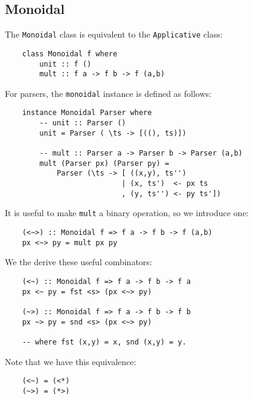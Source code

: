 \documentclass[a4paper,12pt]{article}
\theoremstyle{remark}
\begin{document}
\subsection{Monoidal}

The \lstinline{Monoidal} class is equivalent to the \lstinline{Applicative} class:

\begin{lstlisting}
    class Monoidal f where
        unit :: f ()
        mult :: f a -> f b -> f (a,b)  \end{lstlisting}

For parsers, the \lstinline{monoidal} instance is defined as follows:

\begin{lstlisting}
    instance Monoidal Parser where
        -- unit :: Parser ()
        unit = Parser ( \ts -> [((), ts)])

        -- mult :: Parser a -> Parser b -> Parser (a,b)
        mult (Parser px) (Parser py) =
            Parser (\ts -> [ ((x,y), ts'')
                           | (x, ts')  <- px ts
                           , (y, ts'') <- py ts'])  \end{lstlisting}

\begin{figure}[H]
  \centering
\end{figure}

It is useful to make \lstinline{mult} a binary operation, so we introduce one:

\begin{lstlisting}
    (<~>) :: Monoidal f => f a -> f b -> f (a,b)
    px <~> py = mult px py  \end{lstlisting}

We the derive these useful combinators:

\begin{lstlisting}
    (<~) :: Monoidal f => f a -> f b -> f a
    px <~ py = fst <s> (px <~> py)

    (~>) :: Monoidal f => f a -> f b -> f b
    px ~> py = snd <s> (px <~> py)

    -- where fst (x,y) = x, snd (x,y) = y.  \end{lstlisting}

Note that we have this equivalence:

\begin{lstlisting}
    (<~) = (<*)
    (~>) = (*>)  \end{lstlisting}
\end{document}
